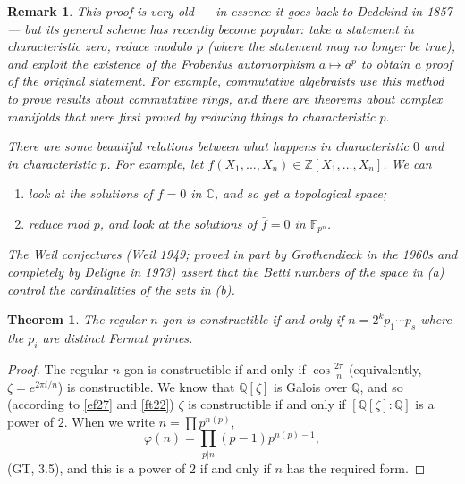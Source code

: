 \documentclass[a4paper,11pt,final,openany]{memoir}
\newtheorem{theorem}[X]{Theorem}
\newtheorem{remark}[X]{Remark}
\theoremstyle{nonumberplain}
\newtheorem{proof}{Proof.}
\begin{document}
\begin{remark}
\label{ag10}This proof is very old --- in essence it goes back to Dedekind in
1857 --- but its general scheme has recently become popular: take a statement
in characteristic zero, reduce modulo $p$ (where the statement may no longer
be true), and exploit the existence of the Frobenius automorphism $a\mapsto
a^{p}$ to obtain a proof of the original statement. For example, commutative
algebraists use this method to prove results about commutative rings, and
there are theorems about complex manifolds that were first proved by reducing
things to characteristic $p.$

There are some beautiful relations between what happens in characteristic $0$
and in characteristic $p$. For example, let $f(X_{1},...,X_{n})\in
\mathbb{Z}[X_{1},...,X_{n}]$. We can

\begin{enumerate}
\item look at the solutions of $f=0$ in $\mathbb{C}$, and so get a topological space;

\item reduce mod $p$, and look at the solutions of $\bar{f}=0$ in
$\mathbb{F}_{p^{n}}$.
\end{enumerate}

\noindent The Weil conjectures (Weil 1949; proved in part by Grothendieck in
the 1960s and completely by Deligne in 1973) assert that the Betti numbers of
the space in (a) control the cardinalities of the sets in (b).
\end{remark}

\begin{theorem}
\label{ag11}%
The regular $n$-gon%
is constructible if and only if $n=2^{k}p_{1}\cdots p_{s}$ where the $p_{i}$
are distinct Fermat primes.
\end{theorem}

\begin{proof}
The regular $n$-gon is constructible if and only if $\cos\frac{2\pi}{n}$
(equivalently, $\zeta=e^{2\pi i/n}$) is constructible. We know that
$\mathbb{Q}[\zeta]$ is Galois over $\mathbb{Q}$, and so (according to
\ref{ef27} and \ref{ft22}) $\zeta$ is constructible if and only if
$[\mathbb{Q}[\zeta]\colon\mathbb{Q}]$ is a power of $2$. When we write
$n=\prod p^{n(p)}$,
\[
\varphi(n)=\prod_{p|n}(p-1)p^{n(p)-1},
\]
(GT, 3.5), and this is a power of $2$ if and only if $n$ has the
required form.
\end{proof}
\end{document}
